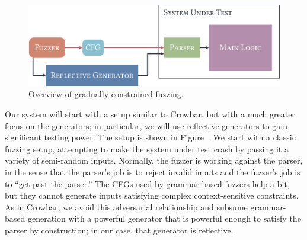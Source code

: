 


\begin{figure}
  \centering
  \includegraphics[width=.4\textwidth]{assets/fuzzing.pdf}
  \caption{Overview of gradually constrained fuzzing.}\label{fig:fuzzing-plan}
\end{figure}

Our system will start with a setup similar to Crowbar, but with a much greater
focus on the generators; in particular, we will use reflective generators to
gain significant testing power. The setup is shown in
Figure~. We start with a classic fuzzing setup, attempting
to make the system under test crash by passing it a variety of semi-random
inputs. Normally, the fuzzer is working against the parser, in the sense that
the parser's job is to reject invalid inputs and the fuzzer's job is to ``get
past the parser.'' The CFGs used by grammar-based fuzzers help a bit, but they
cannot generate inputs satisfying complex context-sensitive constraints. As in
Crowbar, we avoid this adversarial relationship and subsume grammar-based
generation with a powerful generator that is powerful enough to satisfy the
parser by construction; in our case, that generator is reflective.

